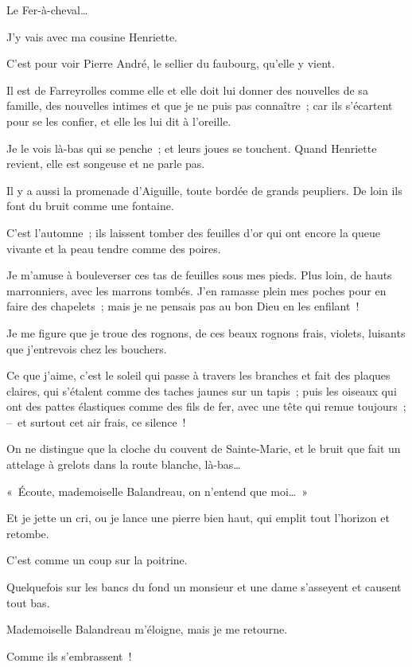\documentclass[french,twoside]{book} %
\begin{document}
\noindent Le Fer-à-cheval…\par
J’y vais avec ma cousine Henriette.\par
C’est pour voir Pierre André, le sellier du faubourg, qu’elle y vient.\par
Il est de Farreyrolles comme elle et elle doit lui donner des nouvelles de sa famille, des nouvelles intimes et que je ne puis pas connaître ; car ils s’écartent pour se les confier, et elle les lui dit à l’oreille.\par
Je le vois là-bas qui se penche ; et leurs joues se touchent. Quand Henriette revient, elle est songeuse et ne parle pas.\par
\bigbreak
\noindent Il y a aussi la promenade d’Aiguille, toute bordée de grands peupliers. De loin ils font du bruit comme une fontaine.\par
C’est l’automne ; ils laissent tomber des feuilles d’or qui ont encore la queue vivante et la peau tendre comme des poires.\par
Je m’amuse à bouleverser ces tas de feuilles sous mes pieds. Plus loin, de hauts marronniers, avec les marrons tombés. J’en ramasse plein mes poches pour en faire des chapelets ; mais je ne pensais pas au bon Dieu en les enfilant !\par
Je me figure que je troue des rognons, de ces beaux rognons frais, violets, luisants que j’entrevois chez les bouchers.\par
\bigbreak
\noindent Ce que j’aime, c’est le soleil qui passe à travers les branches et fait des plaques claires, qui s’étalent comme des taches jaunes sur un tapis ; puis les oiseaux qui ont des pattes élastiques comme des fils de fer, avec une tête qui remue toujours ; – et surtout cet air frais, ce silence !\par
On ne distingue que la cloche du couvent de Sainte-Marie, et le bruit que fait un attelage à grelots dans la route blanche, là-bas…\par
« Écoute, mademoiselle Balandreau, on n’entend que moi… »\par
Et je jette un cri, ou je lance une pierre bien haut, qui emplit tout l’horizon et retombe.\par
C’est comme un coup sur la poitrine.\par
Quelquefois sur les bancs du fond un monsieur et une dame s’asseyent et causent tout bas.\par
Mademoiselle Balandreau m’éloigne, mais je me retourne.\par
Comme ils s’embrassent !\par
\end{document}
